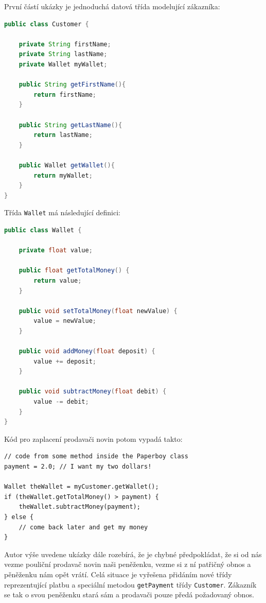 První částí ukázky je jednoduchá datová třída modelující zákazníka:

\begin{lstlisting}[language=java]
public class Customer {

    private String firstName;
    private String lastName;
    private Wallet myWallet;

    public String getFirstName(){
        return firstName;
    }

    public String getLastName(){
        return lastName;
    }

    public Wallet getWallet(){
        return myWallet;
    }
}
\end{lstlisting}

Třída \verb+Wallet+ má následující definici:

\begin{lstlisting}[language=java]
public class Wallet {

    private float value;

    public float getTotalMoney() {
        return value;
    }

    public void setTotalMoney(float newValue) {
        value = newValue;
    }

    public void addMoney(float deposit) {
        value += deposit;
    }

    public void subtractMoney(float debit) {
        value -= debit;
    }
}
\end{lstlisting}

Kód pro zaplacení prodavači novin potom vypadá takto:
\begin{lstlisting}
// code from some method inside the Paperboy class
payment = 2.0; // I want my two dollars!

Wallet theWallet = myCustomer.getWallet();
if (theWallet.getTotalMoney() > payment) {
    theWallet.subtractMoney(payment);
} else {
    // come back later and get my money
}
\end{lstlisting}

Autor výše uvedene ukázky dále rozebírá, že je chybné předpokládat, že si od nás vezme pouliční prodavač novin naši peněženku, vezme si z ní patřičný obnos a pěněženku nám opět vrátí. Celá situace je vyřešena přidáním nové třídy reprezentující platbu a speciální metodou \verb+getPayment+ třídy \verb+Customer+. Zákazník se tak o svou peněženku stará sám a prodavači pouze předá požadovaný obnos.

